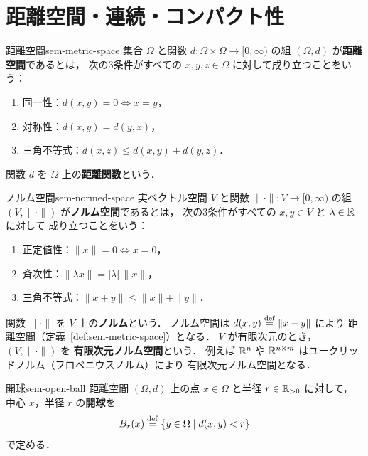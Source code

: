 \chapter{距離空間・連続・コンパクト性}
\label{ch:found-metric}

\begin{definition}{距離空間}{sem-metric-space}
  集合 $\Omega$ と関数 $d \colon \Omega \times \Omega \to [0, \infty)$ の組
  $(\Omega, d)$ が\textbf{距離空間}であるとは，
  次の3条件がすべての $x, y, z \in \Omega$ に対して成り立つことをいう：
  \begin{enumerate}
    \item[(i)] 同一性：$d(x, y) = 0 \iff x = y$，
    \item[(ii)] 対称性：$d(x, y) = d(y, x)$，
    \item[(iii)] 三角不等式：$d(x, z) \leq d(x, y) + d(y, z)$．
  \end{enumerate}
  関数 $d$ を $\Omega$ 上の\textbf{距離関数}という．
\end{definition}

\begin{definition}{ノルム空間}{sem-normed-space}
  実ベクトル空間 $V$ と関数 $\|\cdot\| \colon V \to [0, \infty)$ の組
  $(V, \|\cdot\|)$ が\textbf{ノルム空間}であるとは，
  次の3条件がすべての $x, y \in V$ と $\lambda \in \mathbb{R}$ に対して
  成り立つことをいう：
  \begin{enumerate}
    \item[(i)] 正定値性：$\|x\| = 0 \iff x = 0$，
    \item[(ii)] 斉次性：$\|\lambda x\| = |\lambda|\,\|x\|$，
    \item[(iii)] 三角不等式：$\|x + y\| \leq \|x\| + \|y\|$．
  \end{enumerate}
  関数 $\|\cdot\|$ を $V$ 上の\textbf{ノルム}という．
  ノルム空間は $d(x, y) \overset{\mathrm{def}}{=} \|x - y\|$ により
  距離空間（定義~\ref{def:sem-metric-space}）となる．
  $V$ が有限次元のとき，$(V, \|\cdot\|)$ を
  \textbf{有限次元ノルム空間}という．
  例えば $\mathbb{R}^n$ や $\mathbb{R}^{n \times m}$ はユークリッドノルム（フロベニウスノルム）により
  有限次元ノルム空間となる．
\end{definition}

\begin{definition}{開球}{sem-open-ball}
  距離空間 $(\Omega, d)$ 上の点 $x \in \Omega$ と半径 $r \in \mathbb{R}_{>0}$ に対して，
  中心 $x$，半径 $r$ の\textbf{開球}を
  \[
    B_r(x) \overset{\mathrm{def}}{=} \{y \in \Omega \mid d(x, y) < r\}
  \]
  で定める．
\end{definition}

